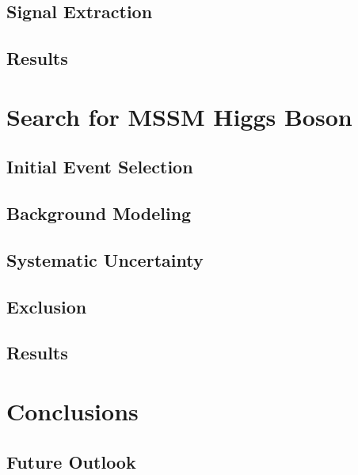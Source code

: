 \documentclass[oneside, letterpaper, 12pt, oldfontcommands]{memoir}
\begin{document}
\section{Signal Extraction}
\section{Results}

\chapter{Search for MSSM Higgs Boson}
\section{Initial Event Selection}
\section{Background Modeling}
\section{Systematic Uncertainty}
\section{Exclusion}
\section{Results}


\chapter{Conclusions}
\section{Future Outlook}
\end{document}
